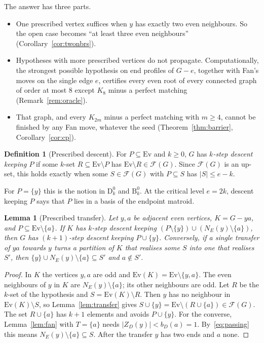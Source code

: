 \documentclass[11pt]{amsart}
\newtheorem{lemma}[theorem]{Lemma}
\theoremstyle{definition}
\newtheorem{definition}[theorem]{Definition}
\newcommand{\cF}{\mathcal F}
\newcommand{\Ev}{\mathrm{Ev}}
\begin{document}
The answer has three parts.
\begin{itemize}
\item One prescribed vertex suffices when $y$ has exactly two even neighbours. So the open case
becomes ``at least three even neighbours'' (Corollary~\ref{cor:twonbrs}).
\item Hypotheses with more prescribed vertices do not propagate. Computationally, the strongest
possible hypothesis on end profiles of $G-e$, together with Fan's moves on the single edge $e$,
certifies every even root of every connected graph of order at most $8$ except $K_8$ minus a perfect
matching (Remark~\ref{rem:oracle}).
\item That graph, and every $K_{2m}$ minus a perfect matching with $m\ge4$, cannot be finished by any
Fan move, whatever the seed (Theorem~\ref{thm:barrier}, Corollary~\ref{cor:cp}).
\end{itemize}

\begin{definition}[Prescribed descent]\label{def:prescribed}
For $P\subseteq\Ev$ and $k\ge0$, $G$ has \emph{$k$-step descent keeping $P$} if some $k$-set
$R\subseteq\Ev\setminus P$ has $\Ev\setminus R\in\cF(G)$. Since $\cF(G)$ is an up-set, this holds
exactly when some $S\in\cF(G)$ with $P\subseteq S$ has $|S|\le e-k$.
\end{definition}

For $P=\{y\}$ this is the notion in $\mathrm{D}^0_k$ and $\mathrm{B}^0_k$. At the critical level
$e=2k$, descent keeping $P$ says that $P$ lies in a basis of the endpoint matroid.

\begin{lemma}[Prescribed transfer]\label{lem:ptransfer}
Let $y,a$ be adjacent even vertices, $K=G-ya$, and $P\subseteq\Ev\setminus\{a\}$. If $K$ has $k$-step
descent keeping $(P\setminus\{y\})\cup(N_E(y)\setminus\{a\})$, then $G$ has $(k+1)$-step descent
keeping $P\cup\{y\}$. Conversely, if a single transfer of $ya$ towards $y$ turns a partition of $K$
that realises some $S$ into one that realises $S'$, then $\{y\}\cup N_E(y)\setminus\{a\}\subseteq S'$
and $a\notin S'$.
\end{lemma}

\begin{proof}
In $K$ the vertices $y,a$ are odd and $\Ev(K)=\Ev\setminus\{y,a\}$. The even neighbours of $y$ in $K$
are $N_E(y)\setminus\{a\}$; its other neighbours are odd. Let $R$ be the $k$-set of the hypothesis and
$S=\Ev(K)\setminus R$. Then $y$ has no neighbour in $\Ev(K)\setminus S$, so
Lemma~\ref{lem:transfer} gives $S\cup\{y\}=\Ev\setminus(R\cup\{a\})\in\cF(G)$. The set $R\cup\{a\}$ has
$k+1$ elements and avoids $P\cup\{y\}$. For the converse, Lemma~\ref{lem:fan} with $T=\{a\}$ needs
$|Z_D(y)|<b_D(a)=1$. By~\eqref{eq:passing} this means $N_E(y)\setminus\{a\}\subseteq S$. After the
transfer $y$ has two ends and $a$ none.
\end{proof}
\end{document}
